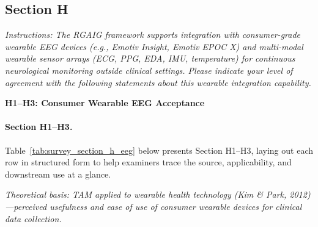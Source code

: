 \subsection{Section H}
\label{subsec:survey_wearable}

\noindent\textit{Instructions: The RGAIG framework supports integration with consumer-grade wearable EEG devices (e.g., Emotiv Insight, Emotiv EPOC X) and multi-modal wearable sensor arrays (ECG, PPG, EDA, IMU, temperature) for continuous neurological monitoring outside clinical settings. Please indicate your level of agreement with the following statements about this wearable integration capability.}

\noindent\textbf{H1--H3: Consumer Wearable EEG Acceptance}
\paragraph{Section H1--H3.}
\noindent Table~\ref{tab:survey_section_h_eeg} below presents Section H1--H3, laying out each row in structured form to help examiners trace the source, applicability, and downstream use at a glance. %


\noindent\textit{Theoretical basis: TAM applied to wearable health technology (Kim \& Park, 2012)---perceived usefulness and ease of use of consumer wearable devices for clinical data collection.}


